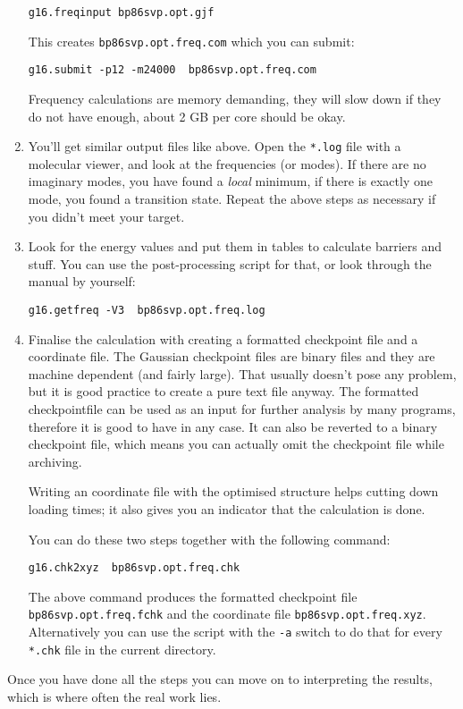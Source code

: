\documentclass[   %
  final,          %
  a4paper         %
]{article}
\begin{document}
\begin{enumerate}
  \lstinline`g16.freqinput bp86svp.opt.gjf`

  This creates \texttt{bp86svp.opt.freq.com} which you can submit:

  \lstinline`g16.submit -p12 -m24000  bp86svp.opt.freq.com`

  Frequency calculations are memory demanding, they will slow down if
  they do not have enough, about 2 GB per core should be okay.
\item
  You'll get similar output files like above. Open the \texttt{*.log}
  file with a molecular viewer, and look at the frequencies (or modes).
  If there are no imaginary modes, you have found a \emph{local}
  minimum, if there is exactly one mode, you found a transition state.
  Repeat the above steps as necessary if you didn't meet your target.
\item
  Look for the energy values and put them in tables to calculate
  barriers and stuff. You can use the post-processing script for that,
  or look through the manual by yourself:

  \lstinline`g16.getfreq -V3  bp86svp.opt.freq.log`
\item
  Finalise the calculation with creating a formatted checkpoint file and
  a coordinate file. The Gaussian checkpoint files are binary files and
  they are machine dependent (and fairly large). 
  That usually doesn't pose any problem, but
  it is good practice to create a pure text file anyway. The formatted
  checkpointfile can be used as an input for further analysis by many
  programs, therefore it is good to have in any case. 
  It can also be reverted to a binary checkpoint file, which means you
  can actually omit the checkpoint file while archiving.
  
  Writing an coordinate file with the optimised structure helps cutting 
  down loading times; it also gives you an indicator that the calculation 
  is done.

  You can do these two steps together with the following command:

  \lstinline`g16.chk2xyz  bp86svp.opt.freq.chk`

  The above command produces the formatted checkpoint file
  \texttt{bp86svp.opt.freq.fchk} and the coordinate file
  \texttt{bp86svp.opt.freq.xyz}. Alternatively you can use the script
  with the \lstinline`-a` switch to do that for every \texttt{*.chk} file
  in the current directory.
\end{enumerate}

Once you have done all the steps you can move on to interpreting the
results, which is where often the real work lies.
\end{document}
